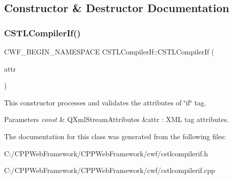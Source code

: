 \subsection{Constructor \& Destructor Documentation}
\mbox{\label{class_c_s_t_l_compiler_if_a6d9ff3428d392123f5139d8ca65e5322}} 
\subsubsection{\texorpdfstring{C\+S\+T\+L\+Compiler\+If()}{CSTLCompilerIf()}}
{\footnotesize\ttfamily C\+W\+F\+\_\+\+B\+E\+G\+I\+N\+\_\+\+N\+A\+M\+E\+S\+P\+A\+CE C\+S\+T\+L\+Compiler\+If\+::\+C\+S\+T\+L\+Compiler\+If (\begin{DoxyParamCaption}\item[{const Q\+Xml\+Stream\+Attributes \&}]{attr }\end{DoxyParamCaption})\hspace{0.3cm}{\ttfamily [explicit]}}



This constructor processes and validates the attributes of \char`\"{}if\char`\"{} tag. 


\begin{DoxyParams}{Parameters}
{\em const} & Q\+Xml\+Stream\+Attributes \&attr \+: X\+ML tag attributes. \\
\hline
\end{DoxyParams}


The documentation for this class was generated from the following files\+:\begin{DoxyCompactItemize}
\item 
C\+:/\+C\+P\+P\+Web\+Framework/\+C\+P\+P\+Web\+Framework/cwf/cstlcompilerif.\+h\item 
C\+:/\+C\+P\+P\+Web\+Framework/\+C\+P\+P\+Web\+Framework/cwf/cstlcompilerif.\+cpp\end{DoxyCompactItemize}
